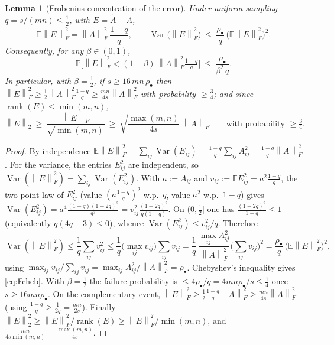 \documentclass{amsart}
\newtheorem{lemma}{Lemma}
\theoremstyle{definition}
\DeclareMathOperator{\rank}{rank}
\DeclareMathOperator{\Var}{Var}
\newcommand{\Frob}[1]{\left\lVert #1\right\rVert_F}
\newcommand{\Op}[1]{\left\lVert #1\right\rVert_2}
\newcommand{\Atil}{\widetilde{A}}
\newcommand{\E}{\mathbb{E}}
\newcommand{\Prob}{\mathbb{P}}
\begin{document}
\begin{lemma}[Frobenius concentration of the error]\label{lem:froblb}
Under uniform sampling $q=s/(mn)\le\tfrac12$, with $E=\Atil-A$,
\begin{equation}\label{eq:EFrob}
\E\Frob E^2=\Frob A^2\,\frac{1-q}{q},\qquad
\Var\big(\Frob E^2\big)\ \le\ \frac{\rho_\bullet}{q}\,\big(\E\Frob E^2\big)^2 .
\end{equation}
Consequently, for any $\beta\in(0,1)$,
\begin{equation}\label{eq:Fcheb}
\Prob\Big[\Frob E^2<(1-\beta)\,\Frob A^2\tfrac{1-q}{q}\Big]
\ \le\ \frac{\rho_\bullet}{\beta^2\,q}.
\end{equation}
In particular, with $\beta=\tfrac12$, if $s\ge 16\,mn\,\rho_\bullet$ then
$\Frob E^2\ge\tfrac12\Frob A^2\frac{1-q}{q}\ge\frac{mn}{4s}\Frob A^2$ with
probability $\ge\tfrac34$; and since $\rank(E)\le\min(m,n)$,
\begin{equation}\label{eq:opfromfrob}
\Op E\ \ge\ \frac{\Frob E}{\sqrt{\min(m,n)}}\ \ge\
\sqrt{\frac{\max(m,n)}{4s}}\ \Frob A
\qquad\text{with probability }\ge\tfrac34 .
\end{equation}
\end{lemma}

\begin{proof}
By independence $\E\Frob E^2=\sum_{ij}\Var(E_{ij})=\frac{1-q}q\sum_{ij}A_{ij}^2
=\frac{1-q}q\Frob A^2$. For the variance, the entries $E_{ij}^2$ are independent,
so $\Var(\Frob E^2)=\sum_{ij}\Var(E_{ij}^2)$. With $a:=A_{ij}$ and
$v_{ij}:=\E E_{ij}^2=a^2\frac{1-q}q$, the two-point law of $E_{ij}^2$ (value
$(a\frac{1-q}q)^2$ w.p.\ $q$, value $a^2$ w.p.\ $1-q$) gives
$\Var(E_{ij}^2)=a^4\frac{(1-q)(1-2q)^2}{q^3}=v_{ij}^2\frac{(1-2q)^2}{q(1-q)}$.
On $(0,\tfrac12]$ one has $\frac{(1-2q)^2}{1-q}\le1$ (equivalently
$q(4q-3)\le0$), whence $\Var(E_{ij}^2)\le v_{ij}^2/q$. Therefore
\[
\Var(\Frob E^2)\le\frac1q\sum_{ij}v_{ij}^2
\le\frac1q\Big(\max_{ij}v_{ij}\Big)\sum_{ij}v_{ij}
=\frac1q\,\frac{\max_{ij}A_{ij}^2}{\Frob A^2}\Big(\sum_{ij}v_{ij}\Big)^2
=\frac{\rho_\bullet}{q}\,\big(\E\Frob E^2\big)^2,
\]
using $\max_{ij}v_{ij}/\sum_{ij}v_{ij}=\max_{ij}A_{ij}^2/\Frob A^2=\rho_\bullet$.
Chebyshev's inequality gives \eqref{eq:Fcheb}. With $\beta=\tfrac12$ the failure
probability is $\le 4\rho_\bullet/q=4mn\rho_\bullet/s\le\tfrac14$ once
$s\ge16mn\rho_\bullet$. On the complementary event,
$\Frob E^2\ge\frac12\frac{1-q}q\Frob A^2\ge\frac{mn}{4s}\Frob A^2$ (using
$\frac{1-q}q\ge\frac1{2q}=\frac{mn}{2s}$). Finally
$\Op E^2\ge\Frob E^2/\rank(E)\ge\Frob E^2/\min(m,n)$, and
$\frac{mn}{4s\min(m,n)}=\frac{\max(m,n)}{4s}$.
\end{proof}
\end{document}
